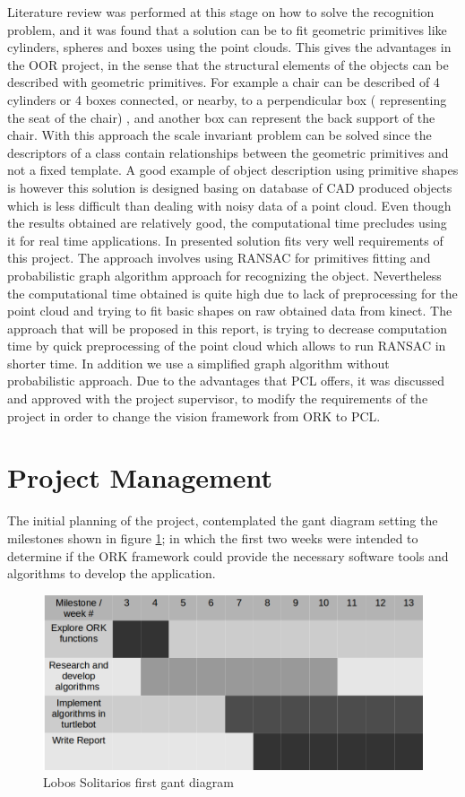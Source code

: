 \documentclass[fontsize=12pt]{article}
\begin{document}
Literature review was performed at this stage on  how to solve the recognition problem, and it was found that a solution can be to fit geometric primitives like cylinders, spheres and boxes using the point clouds. This gives the advantages in the OOR project, in the sense that the structural elements of the objects can be described with geometric primitives. For example a chair can be described of 4 cylinders or 4 boxes connected, or nearby, to a perpendicular box ( representing the seat of the chair) , and another box can represent the  back support of the chair. With this approach the scale invariant problem can be solved since the descriptors of a class contain relationships between the geometric primitives and not a fixed template. 
A good example of object description using primitive shapes is \cite{pap2} however this solution is designed basing on database of CAD produced objects which is less difficult than dealing with noisy data of a point cloud. Even though the results obtained are relatively good, the computational time precludes using it for real time applications. In \cite{pap1} presented solution fits very well requirements of this project. The approach involves using RANSAC for primitives fitting and probabilistic graph algorithm approach for recognizing the object. Nevertheless the computational time obtained is quite high due to lack of preprocessing for the point cloud and trying to fit basic shapes on raw obtained data from kinect. The approach that will be proposed in this report,  is trying to decrease computation time by quick preprocessing of the point cloud which allows to run RANSAC in shorter time. In addition we use a simplified graph algorithm without probabilistic approach. Due to the advantages that PCL offers, it was discussed and approved with the project supervisor, to modify the requirements of the project in order to change the vision framework from ORK to PCL. 

\section{Project Management}
\label{sec:planning}
The initial planning of the project, contemplated  the gant diagram setting the milestones shown in figure \ref{fig:plan1}; in which the first two weeks were intended to determine if the ORK framework could provide the necessary software tools and algorithms to develop the application.
\begin{figure}[H]
\begin{center}
\includegraphics[width=0.8\linewidth]{images/plan1}
\caption{Lobos Solitarios first gant diagram}
\label{fig:plan1}
\end{center}
\end{figure}
\end{document}
